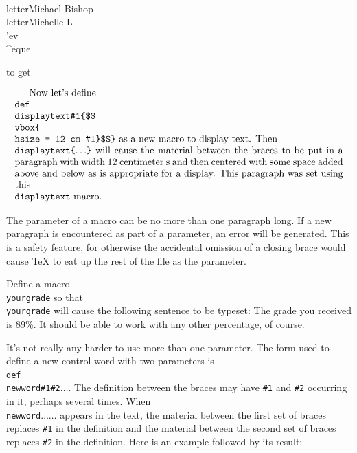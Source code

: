 \beginuser 
\\letter\lb Michael Bishop\rb 
\\letter\lb Michelle L\\'ev\\\^{}eque\rb 
\enduser 

\noindent to get \medskip 
{} 
\goodbreak 
{} 

\def\displaytext#1{$$\vbox{\hsize=12cm #1}$$} 
\bigskip 
\displaytext{ 
Now let's define 
{\tt\\def\\displaytext\#1\lb \$\$\\vbox\lb\\hsize = 12 cm \#1\rb\$\$\rb} 
as a new macro to display text. 
Then {\tt \\displaytext\lb$\ldots$\rb} will cause the material 
between the braces to be put in a paragraph with width 12 centimeter 
s and then centered{} with some space added above and 
below as is appropriate for a display.  This paragraph was set 
using this {\tt \\displaytext} macro. 
} 

The parameter of a macro can be no more than one paragraph long. 
If a new paragraph is encountered as part of a parameter, an 
error will be generated.  This is a safety feature, for 
otherwise the accidental omission of a closing brace would cause 
\TeX{} to eat up the rest of the file as the parameter. 

\exercise Define a macro {\tt \\yourgrade} so that {\tt 
\\yourgrade{}\rb} will cause the following sentence to be 
typeset: The grade you received is 89\%\null. It should be able 
to work with any other percentage, of course. 
\medbreak 

It's not really any harder to use more than one parameter.  The form 
used to define a new control word with two parameters is 
{\tt \\def\\newword\#1\#2\lb$\ldots$\rb}. The definition between the 
braces may have {\tt \#1} and {\tt \#2} occurring in it, perhaps 
several times.  When {\tt \\newword\lb$\ldots$\rb\lb$\ldots$\rb} 
appears in the text, the material between the first set of braces 
replaces {\tt \#1} in the definition and the material between the 
second set of braces replaces {\tt \#2} in the definition.  Here is 
an example followed by its result: 

